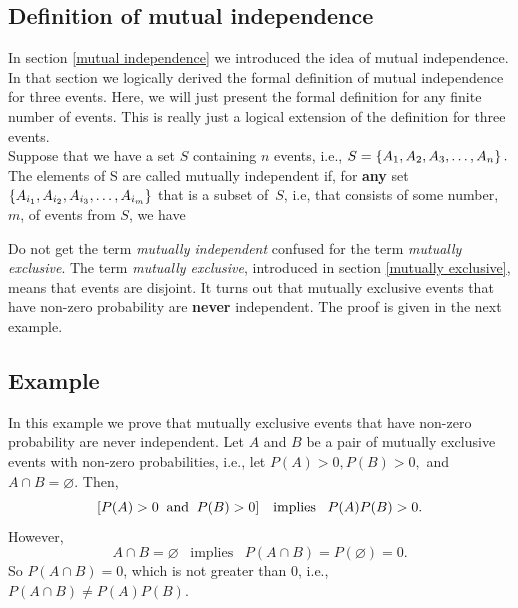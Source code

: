 \subsection{Definition of mutual independence}
In section \ref{mutual independence} we introduced the idea of mutual independence. In that section we logically derived the formal definition of mutual independence for three events. Here, we will just present the formal definition for any finite number of events. This is really just a logical extension of the definition for three events.  \\

\noindent Suppose that we have a set $S$ containing $n$ events, i.e., $S = \left\{A_1,A_2,A_3,\ldots,A_n\right\}.$ The elements of S are called mutually independent if, for \textbf{any} set $\left\{A_{i_1},A_{i_2},A_{i_3},\ldots,A_{i_m}\right\}$ that is a subset of~$S$, i.e, that consists of some number, $m$, of events from $S$, we have

\bigskip
\hfil{}
\bigskip

Do not get the term \textit{mutually independent} confused for the term \textit{mutually exclusive}. The term \textit{mutually exclusive}, introduced in section \ref{mutually exclusive}, means that events are disjoint. It turns out that mutually exclusive events that have non-zero probability are \textbf{never} independent. The proof is given in the next example.

\subsection{Example}
In this example we prove that mutually exclusive events that have non-zero probability are never independent. Let $A$ and $B$ be a pair of mutually exclusive events with non-zero probabilities, i.e., let $P(A) > 0, P(B) > 0,$ and $A \cap B = \varnothing$. Then,
\[
\left[P(A) > 0 \;\; \text{and} \;\; P(B) > 0\right] \;\;\; \text{implies} \;\;\; P(A)P(B) > 0.
\]
However,
\[
A \cap B = \varnothing \;\;\; \text{implies} \;\;\; P(A \cap B) = P(\varnothing) = 0. \tag{consequence 3, p.measure axioms}
\]
So $P(A \cap B) = 0$, which is not greater than 0, i.e., $P(A \cap B) \neq P(A)P(B).$ \\

